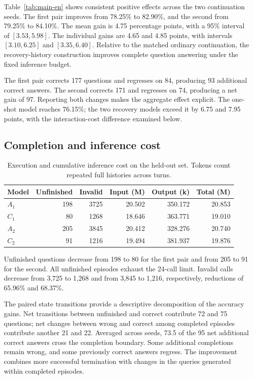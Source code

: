 \documentclass[a4paper,12pt]{article}
\begin{document}
Table~\ref{tab:main-en} shows consistent positive effects across the two continuation seeds. The first pair improves from 78.25\% to 82.90\%, and the second from 79.25\% to 84.10\%. The mean gain is 4.75 percentage points, with a 95\% interval of $[3.53,5.98]$. The individual gains are 4.65 and 4.85 points, with intervals $[3.10,6.25]$ and $[3.35,6.40]$. Relative to the matched ordinary continuation, the recovery-history construction improves complete question answering under the fixed inference budget.

The first pair corrects 177 questions and regresses on 84, producing 93 additional correct answers. The second corrects 171 and regresses on 74, producing a net gain of 97. Reporting both changes makes the aggregate effect explicit. The one-shot model reaches 76.15\%; the two recovery models exceed it by 6.75 and 7.95 points, with the interaction-cost difference examined below.

\subsection{Completion and inference cost}

\begin{table}[htbp]
 \centering
 \caption{Execution and cumulative inference cost on the held-out set. Tokens count repeated full histories across turns.}
 \label{tab:cost-en}
 \begin{tabular}{@{}lrrrrr@{}}
\toprule
Model & Unfinished & Invalid & Input (M) & Output (k) & Total (M) \\
\midrule
$A_{1}$ & 198 & 3725 & 20.502 & 350.172 & 20.853 \\
$C_{1}$ & 80 & 1268 & 18.646 & 363.771 & 19.010 \\
$A_{2}$ & 205 & 3845 & 20.412 & 328.276 & 20.740 \\
$C_{2}$ & 91 & 1216 & 19.494 & 381.937 & 19.876 \\
\bottomrule
\end{tabular}
\end{table}

Unfinished questions decrease from 198 to 80 for the first pair and from 205 to 91 for the second. All unfinished episodes exhaust the 24-call limit. Invalid calls decrease from 3,725 to 1,268 and from 3,845 to 1,216, respectively, reductions of 65.96\% and 68.37\%.

The paired state transitions provide a descriptive decomposition of the accuracy gains. Net transitions between unfinished and correct contribute 72 and 75 questions; net changes between wrong and correct among completed episodes contribute another 21 and 22. Averaged across seeds, 73.5 of the 95 net additional correct answers cross the completion boundary. Some additional completions remain wrong, and some previously correct answers regress. The improvement combines more successful termination with changes in the queries generated within completed episodes.
\end{document}
